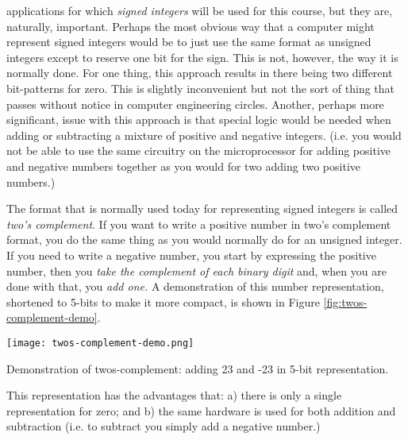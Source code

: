  applications for which \emph{signed integers} will be used for this course, but they are, naturally, important.  Perhaps the most obvious way that a computer might represent signed integers would be to just use the same format as unsigned integers except to reserve one bit for the sign.  This is not, however, the way it is normally done.  For one thing, this approach results in there being two different bit-patterns for zero.  This is slightly inconvenient but not the sort of thing that passes without notice in computer engineering circles. Another, perhaps more significant, issue with this approach is that special logic would be needed when adding or subtracting a mixture of positive and negative integers. (i.e. you would not be able to use the same circuitry on the microprocessor for adding positive and negative numbers together as you would for two adding two positive numbers.)
  
The format that is normally used today for representing signed integers is called \emph{two's complement}.  If you want to write a positive number in two's complement format, you do the same thing as you would normally do for an unsigned integer. If you need to write a negative number, you start by expressing the positive number, then you \emph{take the complement of each binary digit} and, when you are done with that, you \emph{add one.} A demonstration of this number representation, shortened to 5-bits to make it more compact, is shown in Figure \ref{fig:twos-complement-demo}.  


\begin{marginfigure}
\texttt{[image: twos-complement-demo.png]}
\caption{Demonstration of twos-complement: adding 23 and -23 in 5-bit representation.}
\label{fig:twos-complement-demo}
\end{marginfigure}


This representation has the advantages that: a) there is only a single representation for zero; and b) the same hardware is used for both addition and subtraction (i.e. to subtract you simply add a negative number.)

